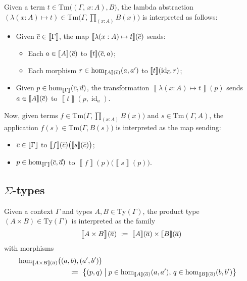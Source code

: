 \documentclass{article}
\theoremstyle{definition}
\renewcommand{\int}[1]{\mathopen{}\left\llbracket #1
    \right\rrbracket\mathclose{}}       %
\newcommand{\Pii}[2]{\textstyle\prod_{#1} #2}             %
\newcommand{\lam}[2]{\lambda #1 \mapsto #2}
\newcommand{\Ty}{\mathrm{Ty}}
\newcommand{\Tm}{\mathrm{Tm}}
\renewcommand{\hom}[3][]{\mathrm{hom}_{#1}\mathopen{}\left( #2, #3 \right)\mathclose{}}
\DeclareMathOperator{\id}{id}				    %
\newcommand{\defeq}{
	\mathrel{\mathrel{\mathop:}\mkern-1.2mu=}}	%
\newcommand{\tup}[1]{\overline{\smash{#1}\vphantom{a}}}
\newcommand{\n}{%
}                %
\begin{document}
Given a term $t \in \Tm \big( (\Gamma,\, x:A), B \big)$, the lambda abstraction $(\lam{(x:A)}{t}) \in \Tm\big( \Gamma, \Pii{(x:A)}{B(x)} \big)$ is interpreted as follows:
\begin{itemize}
    \item Given $\tup{c} \in \int{\Gamma}$, the map $\int{\lam{(x:A)}{t}}(\tup{c})%
    $ sends:
    \begin{itemize}
        \item Each $a \in \int{A}(\tup{c})$ to $\int{t}(\tup{c},a)%
        $;
    
        \item Each morphism $r \in \hom[\int{A}(\tup{c})]{a}{a'}$ to $\int{t}(\id_{\tup{c}},r)$;%
    \end{itemize}
    
    \item Given $p \in \hom[\int{\Gamma}]{\tup{c}}{\tup{d}}$, the 
    transformation $\int{\lam{(x:A)}{t}}(p)%
    $ sends $a \in \int{A}(\tup{c})$ to $\int{t}(p,\id_a)$.
\end{itemize}

Now, given terms $f \in \Tm\big( \Gamma, \Pii{(x:A)}{B(x)} \big)$ and $s \in \Tm(\Gamma, A)$, the application $f(s) \in \Tm\big(\Gamma, B(s) \big)$ is interpreted as the map sending:
\begin{itemize}
    \item $\tup{c} \in \int{\Gamma}$ to $\int{f}(\tup{c})\big( \int{s}(\tup{c}) \big)$;
    
    \item $p \in \hom[\int{\Gamma}]{\tup{c}}{\tup{d}}$ to $\int{f}(p)\big( \int{s}(p) \big)$.
\end{itemize}


\subsection{\texorpdfstring{$\Sigma$}{Sigma}-types}

Given a context $\Gamma$ and types $A, B \in \Ty(\Gamma)$, the product type $(A \times B) \in \Ty(\Gamma)$ is interpreted as the family
$$\int{\big.A \times B}\n(\tup{a})\ \defeq\ \int{A}\n(\tup{a}) \times \int{B}\n(\tup{a})$$
with morphisms
\begin{align*}
    \hom[\int{A \times B}(\tup{a})]{\big.(a,b)}{(a',b')}\\ \defeq\ \big\{ (p,q)& \mathrel{\big|} p \in \hom[\int{A}(\tup{a})]{a}{a'},\, q \in \hom[\int{B}(\tup{a})]{b}{b'} \big\}
\end{align*}
\end{document}

